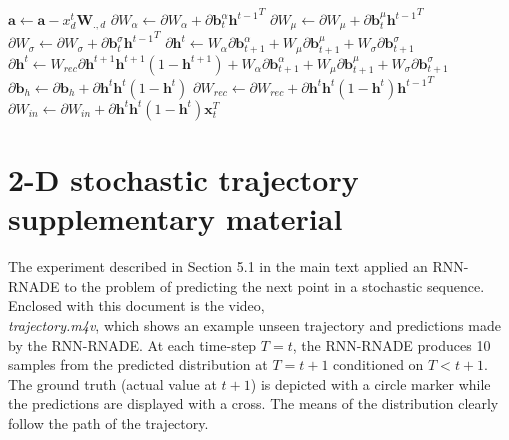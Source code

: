 \documentclass{article} %
\begin{document}
\begin{algorithm}
\begin{algorithmic}
\Else
	\State $\mathbf{a} \gets \mathbf{a} - x^{t}_d \mathbf{W}_{.,d}$
\EndIf
\EndFor
\State $\partial W_{\alpha} \gets \partial W_{\alpha} + \partial \mathbf{b}^{\alpha}_{t}{\mathbf{h}^{t-1}}^T$
\State $\partial W_{\mu} \gets \partial W_{\mu} + \partial \mathbf{b}^{\mu}_{t}{\mathbf{h}^{t-1}}^T$
\State $\partial W_{\sigma} \gets \partial W_{\sigma} + \partial \mathbf{b}^{\sigma}_{t}{\mathbf{h}^{t-1}}^T$
	\State $\partial \mathbf{h}^{t} \gets  W_{\alpha} \partial \mathbf{b}^{\alpha}_{t+1} + W_{\mu} \partial \mathbf{b}^{\mu}_{t+1} + W_{\sigma} \partial \mathbf{b}^{\sigma}_{t+1}$
\Else
	\State $\partial \mathbf{h}^{t} \gets W_{rec}\partial  \mathbf{h}^{t+1}\mathbf{h}^{t+1}(1-\mathbf{h}^{t+1}) + W_{\alpha} \partial \mathbf{b}^{\alpha}_{t+1} + W_{\mu} \partial \mathbf{b}^{\mu}_{t+1} + W_{\sigma} \partial \mathbf{b}^{\sigma}_{t+1}$
\EndIf
\State $\partial \mathbf{b}_h \gets \partial \mathbf{b}_h + \partial \mathbf{h}^{t} \mathbf{h}^{t} (1-\mathbf{h}^{t})$
\State $\partial W_{rec} \gets \partial W_{rec} + \partial \mathbf{h}^{t} \mathbf{h}^{t} (1-\mathbf{h}^{t}){\mathbf{h}^{t-1}}^T$
\State $\partial W_{in} \gets \partial W_{in} + \partial \mathbf{h}^{t} \mathbf{h}^{t} (1-\mathbf{h}^{t})\mathbf{x}_t^T$
\EndFor
\end{algorithmic}
\end{algorithm}
\newpage
\section{2-D stochastic trajectory supplementary material}
The experiment described in Section 5.1 in the main text applied an RNN-RNADE to the problem of predicting the next point in a stochastic sequence. Enclosed with this document is the video,\\ {\it trajectory.m4v}, which shows an example unseen trajectory and predictions made by the RNN-RNADE. At each time-step \(T=t\), the RNN-RNADE produces 10 samples from the predicted distribution at \(T=t+1\) conditioned on \(T<t+1\). The ground truth (actual value at \(t+1\)) is depicted with a circle marker while the predictions are displayed with a cross. The means of the distribution clearly follow the path of the trajectory. 
\end{document}
